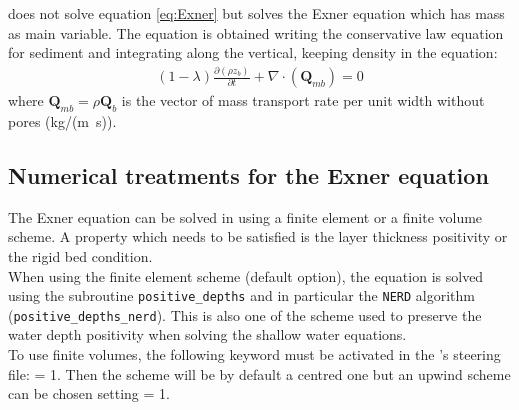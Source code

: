 \gaia{} does not solve equation \eqref{eq:Exner} but solves the Exner equation which has mass as main variable. The equation is obtained writing the conservative law equation for sediment and integrating along the vertical, keeping density in the equation:
\begin{align}
(1-\lambda)\frac{\partial \left(\rho z_b\right)}{\partial t} + \nabla\cdot \left(\mathbf Q_{mb}\right) = 0
\label{eq:Exner_mass}
\end{align}
where $\mathbf Q_{mb}=\rho \mathbf Q_b$ is the vector of mass transport rate per unit width without pores (kg/(m~s)).

\subsection{Numerical treatments for the Exner equation}
The Exner equation can be solved in \gaia{} using a finite element or a finite volume scheme. A property which needs to be satisfied is the layer thickness positivity or the rigid bed condition. \\
When using the finite element scheme (default option), the equation is solved using the subroutine \texttt{positive\_depths} and in particular the \texttt{NERD} algorithm (\texttt{positive\_depths\_nerd}). This is also one of the scheme used to preserve the water depth positivity when solving the shallow water equations. \\
To use finite volumes, the following keyword must be activated in the \gaia{}'s steering file:  {\ttfamily = 1}. Then the scheme will be by default a centred one but an upwind scheme can be chosen setting  {\ttfamily = 1}.

